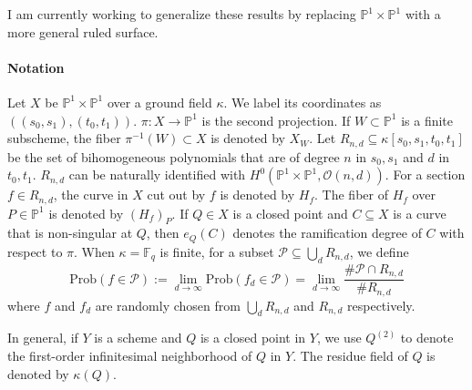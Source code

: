\documentclass[12pt]{article}
\theoremstyle{plain}
\theoremstyle{definition}
\newcommand{\IF}{\mathbb{F}}
\newcommand{\IP}{\mathbb{P}}
\newcommand{\sO}{\mathcal{O}}
\newcommand{\sP}{\mathcal{P}}
\newcommand\union{\bigcup}
\newcommand{\<}{\langle}
\renewcommand{\>}{\rangle}
\newcommand{\Prob}{\mathrm{Prob}}
\begin{document}
I am currently working to generalize these results by replacing $\IP^1 \times \IP^1$ with a more general ruled surface.   


\paragraph{Notation} 
Let $X$ be $\IP^1 \times \IP^1$ over a ground field $\kappa$. We label its coordinates as $((s_0, s_1), (t_0, t_1))$. $\pi : X \to \IP^1$ is the second projection. If $W \subset \IP^1$ is a finite subscheme, the fiber $\pi^{-1}(W) \subset X$ is denoted by $X_W$. Let $R_{n, d} \subseteq \kappa[s_0, s_1, t_0, t_1]$ be the set of bihomogeneous polynomials that are of degree $n$ in $s_0, s_1$ and $d$ in $t_0, t_1$. $R_{n, d}$ can be naturally identified with $H^0(\IP^1 \times \IP^1, \sO(n, d))$. For a section $f \in R_{n, d}$, the curve in $X$ cut out by $f$ is denoted by $H_f$. The fiber of $H_f$ over $P \in \IP^1$ is denoted by $(H_f)_P$. If $Q \in X$ is a closed point and $C \subseteq X$ is a curve that is non-singular at $Q$, then $e_Q(C)$ denotes the ramification degree of $C$ with respect to $\pi$. When $\kappa = \IF_q$ is finite, for a subset $\sP \subseteq \union_d R_{n, d}$, we define 
$$ \Prob(f \in \sP) := \lim_{d \to \infty}\Prob(f_d \in \sP) = \lim_{d \to \infty} \frac{\# \sP \cap R_{n, d}}{\# R_{n, d}}$$
where $f$ and $f_d$ are randomly chosen from $\union_{d} R_{n, d}$ and $R_{n, d}$ respectively. 

In general, if $Y$ is a scheme and $Q$ is a closed point in $Y$, we use $Q^{(2)}$ to denote the first-order infinitesimal neighborhood of $Q$ in $Y$. The residue field of $Q$ is denoted by $\kappa(Q)$.
\end{document}
